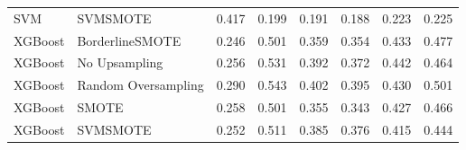 \begin{tabular}{llllllll}
                            SVM &                      SVMSMOTE & 0.417 &                     0.199 &                 0.191 &                  0.188 &                                   0.223 &     0.225 \\
                        XGBoost &               BorderlineSMOTE & 0.246 &                     0.501 &                 0.359 &                  0.354 &                                   0.433 &     0.477 \\
                        XGBoost &                 No Upsampling & 0.256 &                     0.531 &                 0.392 &                  0.372 &                                   0.442 &     0.464 \\
                        XGBoost &           Random Oversampling & 0.290 &                     0.543 &                 0.402 &                  0.395 &                                   0.430 &     0.501 \\
                        XGBoost &                         SMOTE & 0.258 &                     0.501 &                 0.355 &                  0.343 &                                   0.427 &     0.466 \\
                        XGBoost &                      SVMSMOTE & 0.252 &                     0.511 &                 0.385 &                  0.376 &                                   0.415 &     0.444 \\
\bottomrule
\end{tabular}
